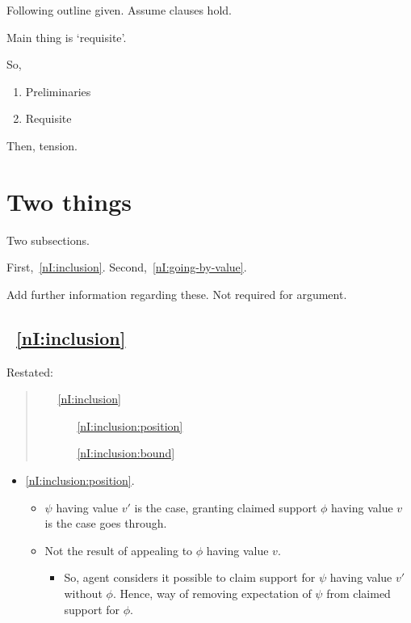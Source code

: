 \begin{note}
  Following outline given.
  Assume clauses hold.

  Main thing is `requisite'.

  So,
  \begin{enumerate}
  \item Preliminaries
  \item Requisite
  \end{enumerate}
  Then, tension.
\end{note}

\section{Two things}
\label{sec:nI:arg:clauses}

\begin{note}
  Two subsections.

  First,~\ref{nI:inclusion}.
  Second,~\ref{nI:going-by-value}.

  Add further information regarding these.
  Not required for argument.
\end{note}

\subsection{~\ref{nI:inclusion}}

\begin{note}[\ref{nI:inclusion}]
  Restated:
  \begin{quote}
    \begin{enumerate}
    \item[\ref{nI:inclusion}]
      \nIClauseInclusion{}
      \begin{enumerate}
      \item[\ref{nI:inclusion:position}] \nIClauseInclusionPosition{}
      \item[\ref{nI:inclusion:bound}] \nIClauseInclusioBound{}
      \end{enumerate}
    \end{enumerate}
  \end{quote}
\end{note}

\begin{note}
  \begin{itemize}
  \item \ref{nI:inclusion:position}.
    \begin{itemize}
    \item \(\psi\) having value \(v'\) is the case, granting claimed support \(\phi\) having value \(v\) is the case goes through.
    \item Not the result of appealing to \(\phi\) having value \(v\).
      \begin{itemize}
      \item So, agent considers it possible to claim support for \(\psi\) having value \(v'\) without \(\phi\).
        Hence, way of removing expectation of \(\psi\) from claimed support for \(\phi\).
      \end{itemize}
    \end{itemize}
  \end{itemize}
\end{note}

